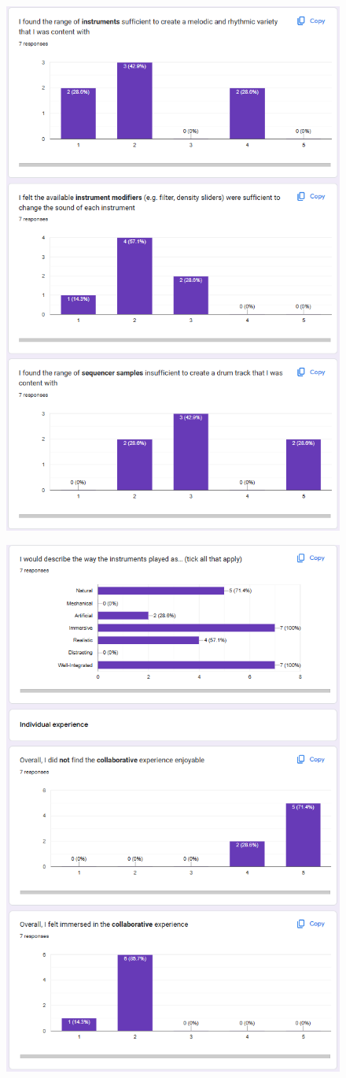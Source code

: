 \begin{appendices}
\begin{figure}[htb]
    \includegraphics[width=0.8\linewidth]{images/survey-results/7.png}    
\end{figure}
\begin{figure}[htb]
    \centering
    \includegraphics[width=0.8\linewidth]{images/survey-results/8.png}    

\end{figure}
\end{appendices}
